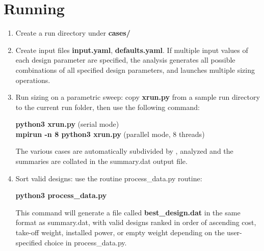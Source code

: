 \section{Running \hydra}
\begin{enumerate}
\item Create a run directory under \textbf{cases/}
\item Create input files \textbf{input.yaml}, \textbf{defaults.yaml}. If multiple input values of each design parameter are specified, the analysis generates all possible combinations of all specified design parameters, and launches multiple sizing operations.
\item Run sizing on a parametric sweep: copy \textbf{xrun.py} from a sample run directory to the current run folder, then use the following command:
\begin{center}
\textbf{python3 xrun.py} (serial mode)\\
\textbf{mpirun -n 8 python3 xrun.py} (parallel mode, 8 threads)
\end{center}
The various cases are automatically subdivided by \hydra \spc, analyzed and the summaries are collated in the summary.dat output file.
\item Sort valid designs: use the routine process\_data.py routine:
\begin{center}
\textbf{python3 process\_data.py}
\end{center}
This command will generate a file called \textbf{best\_design.dat} in the same format as summary.dat, with valid designs ranked in order of ascending cost, take-off weight, installed power, or empty weight depending on the user-specified choice in process\_data.py.
\end{enumerate}

